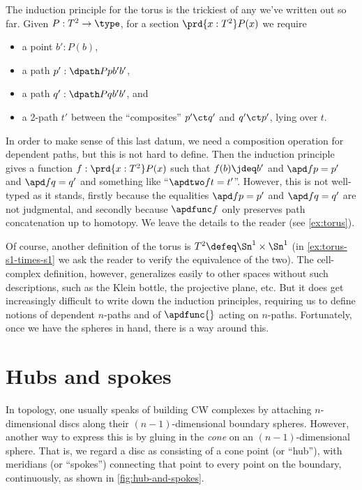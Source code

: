 %
%
The induction principle for the torus is the trickiest of any we've written out so far.
Given $P:T^2\to\type$, for a section $\prd{x:T^2} P(x)$ we require
\begin{itemize}
\item a point $b':P(b)$,
\item a path $p' : \dpath P p {b'} {b'}$,
\item a path $q' : \dpath P q {b'} {b'}$, and
\item a 2-path $t'$ between the ``composites'' $p'\ct q'$ and $q'\ct p'$, lying over $t$.
\end{itemize}
In order to make sense of this last datum, we need a composition operation for dependent paths, but this is not hard to define.
Then the induction principle gives a function $f:\prd{x:T^2} P(x)$ such that $f(b)\jdeq b'$ and $\apd f {p} = p'$ and $\apd f {q} = q'$ and something like ``$\apdtwo f t = t'$''.
However, this is not well-typed as it stands, firstly because the equalities $\apd f {p} = p'$ and $\apd f {q} = q'$ are not judgmental, and secondly because $\apdfunc f$ only preserves path concatenation up to homotopy.
We leave the details to the reader (see \cref{ex:torus}).

Of course, another definition of the torus is $T^2 \defeq \Sn^1 \times \Sn^1$ (in \cref{ex:torus-s1-times-s1} we ask the reader to verify the equivalence of the two).
%
%
The cell-complex definition, however, generalizes easily to other spaces without such descriptions, such as the Klein bottle, the projective plane, etc.
But it does get increasingly difficult to write down the induction principles, requiring us to define notions of dependent $n$-paths and of $\apdfunc{}$ acting on $n$-paths.
Fortunately, once we have the spheres in hand, there is a way around this.

\section{Hubs and spokes}
\label{sec:hubs-spokes}

%
%

In topology, one usually speaks of building CW complexes by attaching $n$-dimensional discs along their $(n-1)$-dimensional boundary spheres.
%
However, another way to express this is by gluing in the \emph{cone} on an $(n-1)$-dimensional sphere.
That is, we regard a disc as consisting of a cone point (or ``hub''), with meridians
%
(or ``spokes'') connecting that point to every point on the boundary, continuously, as shown in \cref{fig:hub-and-spokes}.

